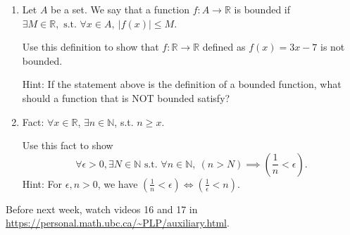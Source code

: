 \documentclass[12pt]{article}
\newcommand{\st}{\text{ s.t. }}
\begin{document}
\begin{enumerate}
\item Let $A$ be a set. We say that a function $f: A\to \mathbb R$ is bounded if $\exists M\in\mathbb R, \st \forall x\in A,\  |f(x)|\leq M$.

Use this definition to show that $f:\mathbb R\to \mathbb R$ defined as $f(x)=3x-7$ is not bounded.

Hint: If the statement above is the definition of a bounded function, what should a function that is NOT bounded satisfy?

\item Fact: $\forall x\in\mathbb R$, $\exists n\in\mathbb N$, s.t. $n\geq x$.

Use this fact to show
\[\forall \epsilon>0, \exists N\in\mathbb N \st \forall n\in\mathbb N,\ (n > N) \implies \left(\dfrac{1}{n}<\epsilon \right).\] 
Hint: For $\epsilon, n>0$, we have $(\frac 1n<\epsilon) \iff (\frac{1}{\epsilon}<n)$.

\end{enumerate}

Before next week, watch videos 16 and 17 in \url{https://personal.math.ubc.ca/~PLP/auxiliary.html}.
\end{document}
